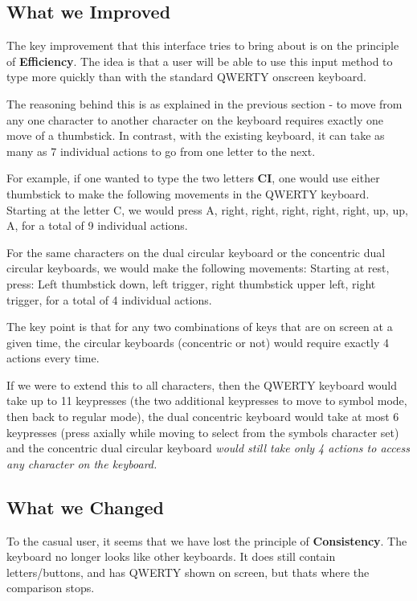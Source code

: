 \documentclass[
	letterpaper, %
]{jdf}
\begin{document}
\subsection{What we Improved}
The key improvement that this interface tries to bring about is on the principle of \textbf{Efficiency}. The idea is that a user will be able to use this input method to type more quickly than with the standard QWERTY onscreen keyboard.

The reasoning behind this is as explained in the previous section - to move from any one character to another character on the keyboard requires exactly one move of a thumbstick. In contrast, with the existing keyboard, it can take as many as 7 individual actions to go from one letter to the next. 

For example, if one wanted to type the two letters \textbf{CI}, one would use either thumbstick to make the following movements in the QWERTY keyboard. Starting at the letter C, we would press A, right, right, right, right, right, up, up, A, for a total of 9 individual actions.

For the same characters on the dual circular keyboard or the concentric dual circular keyboards, we would make the following movements: Starting at rest, press: Left thumbstick down, left trigger, right thumbstick upper left, right trigger, for a total of 4 individual actions. 

The key point is that for any two combinations of keys that are on screen at a given time, the circular keyboards (concentric or not) would require exactly 4 actions every time. 

If we were to extend this to all characters, then the QWERTY keyboard would take up to 11 keypresses (the two additional keypresses to move to symbol mode, then back to regular mode), the dual concentric keyboard would take at most 6 keypresses (press axially while moving to select from the symbols character set) and the concentric dual circular keyboard \textit{would still take only 4 actions to access any character on the keyboard.}

\subsection{What we Changed}
To the casual user, it seems that we have lost the principle of  \textbf{Consistency}. The keyboard no longer looks like other keyboards. It does still contain letters/buttons, and has QWERTY shown on screen, but thats where the comparison stops.
\end{document}
